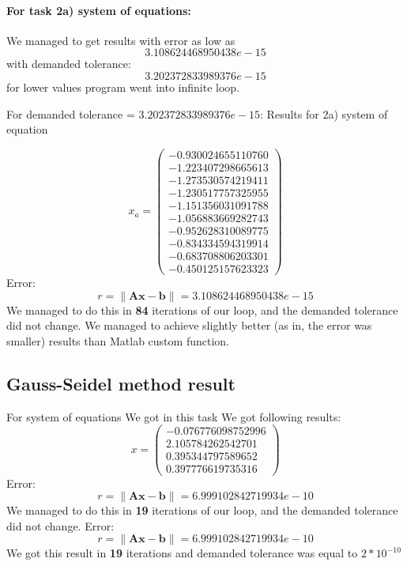 \documentclass[12pt]{report}
\begin{document}
\paragraph{For task 2a) system of equations:}
We managed to get results with error as low as
\[ 3.108624468950438e-15 \] with demanded tolerance:
\[ 3.202372833989376e-15 \]
for lower values program went into infinite loop.

For demanded tolerance = $3.202372833989376e-15$:
Results for 2a) system of equation

\[ x_a = \left( \begin{array}{cc}
-0.930024655110760 \\
-1.223407298665613 \\
-1.273530574219411 \\
-1.230517757325955 \\
-1.151356031091788 \\
-1.056883669282743 \\
-0.952628310089775 \\
-0.834334594319914 \\
-0.683708806203301 \\
-0.450125157623323
\end{array} \right)
\]
Error:
\[ r = \| \mathbf{A}\mathbf{x} - \mathbf{b}\| = 3.108624468950438e-15 \]
We managed to do this in \textbf{84} iterations of our loop, and the demanded tolerance did not change.
We managed to achieve slightly better (as in, the error was smaller) results than Matlab custom function.

\subsection{Gauss-Seidel method result}
For system of equations We got in this task We got following results:
\\
\[ x = \left( \begin{array}{cc}
  -0.076776098752996 \\
   2.105784262542701 \\
   0.395344797589652 \\
   0.397776619735316
\end{array} \right)
\]
Error:
\[ r = \| \mathbf{A}\mathbf{x} - \mathbf{b}\| = 6.999102842719934e-10 \]
We managed to do this in \textbf{19} iterations of our loop, and the demanded tolerance did not change.
Error:
\[ r = \| \mathbf{A}\mathbf{x} - \mathbf{b}\| = 6.999102842719934e-10 \]
We got this result in \textbf{19} iterations and demanded tolerance was equal to $2*10^{-10}$
\end{document}
